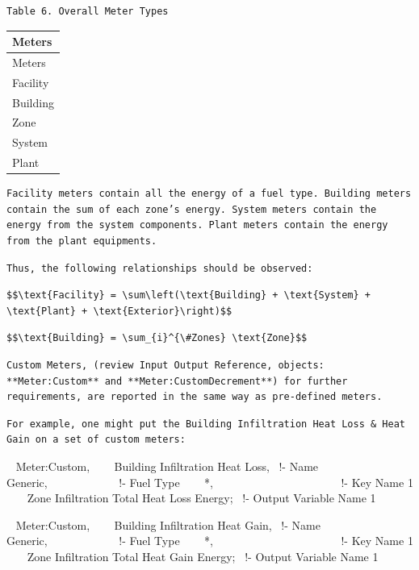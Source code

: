\begin{lstlisting}
Table 6. Overall Meter Types
\end{lstlisting}

\begin{longtable}[c]{@{}l@{}}
\toprule 
Meters \tabularnewline
\midrule
\endfirsthead

\toprule 
Meters \tabularnewline
\midrule
\endhead

Facility \tabularnewline
Building \tabularnewline
Zone \tabularnewline
System \tabularnewline
Plant \tabularnewline
\bottomrule
\end{longtable}

\begin{lstlisting}
Facility meters contain all the energy of a fuel type. Building meters contain the sum of each zone’s energy. System meters contain the energy from the system components. Plant meters contain the energy from the plant equipments.
\end{lstlisting}

\begin{lstlisting}
Thus, the following relationships should be observed:
\end{lstlisting}

\begin{lstlisting}
$$\text{Facility} = \sum\left(\text{Building} + \text{System} + \text{Plant} + \text{Exterior}\right)$$ 
\end{lstlisting}

\begin{lstlisting}
$$\text{Building} = \sum_{i}^{\#Zones} \text{Zone}$$ 
\end{lstlisting}

\begin{lstlisting}
Custom Meters, (review Input Output Reference, objects: **Meter:Custom** and **Meter:CustomDecrement**) for further requirements, are reported in the same way as pre-defined meters.
\end{lstlisting}

\begin{lstlisting}
For example, one might put the Building Infiltration Heat Loss & Heat Gain on a set of custom meters:
\end{lstlisting}

~ Meter:Custom, ~~~ Building Infiltration Heat Loss,~ !- Name ~~~ Generic,~~~~~~~~~~~~ !- Fuel Type ~~~ *,~~~~~~~~~~~~~~~~~~~~~~ !- Key Name 1 ~~~ Zone Infiltration Total Heat Loss Energy;~ !- Output Variable Name 1

~ Meter:Custom, ~~ ~Building Infiltration Heat Gain,~ !- Name ~~~ Generic,~~~~~~~~~~~~ !- Fuel Type ~~~ *,~~~~~~~~~~~~~~~~~~~~~~ !- Key Name 1 ~~~ Zone Infiltration Total Heat Gain Energy;~ !- Output Variable Name 1

